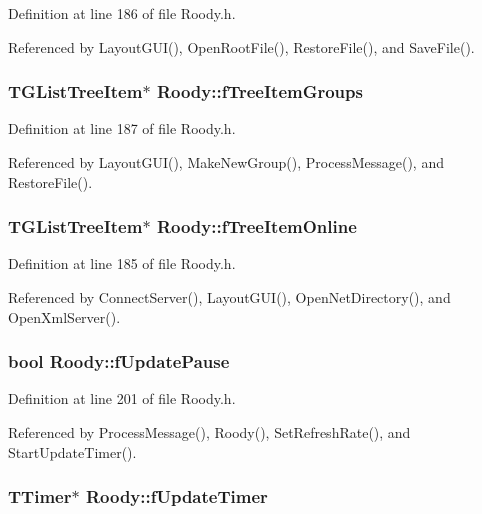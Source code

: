 Definition at line 186 of file Roody.h.

Referenced by LayoutGUI(), OpenRootFile(), RestoreFile(), and SaveFile().
\subsubsection[{fTreeItemGroups}]{\setlength{\rightskip}{0pt plus 5cm}TGListTreeItem$\ast$ {\bf Roody::fTreeItemGroups}\hspace{0.3cm}{\ttfamily  [protected]}}\label{classRoody_a992daab6fccc73ab000819a4486fe283}


Definition at line 187 of file Roody.h.

Referenced by LayoutGUI(), MakeNewGroup(), ProcessMessage(), and RestoreFile().
\subsubsection[{fTreeItemOnline}]{\setlength{\rightskip}{0pt plus 5cm}TGListTreeItem$\ast$ {\bf Roody::fTreeItemOnline}\hspace{0.3cm}{\ttfamily  [protected]}}\label{classRoody_ac608da81c5949e10666e37aea706cc5e}


Definition at line 185 of file Roody.h.

Referenced by ConnectServer(), LayoutGUI(), OpenNetDirectory(), and OpenXmlServer().
\subsubsection[{fUpdatePause}]{\setlength{\rightskip}{0pt plus 5cm}bool {\bf Roody::fUpdatePause}\hspace{0.3cm}{\ttfamily  [private]}}\label{classRoody_a96fbcb2282d22a39069dd14c326185bb}


Definition at line 201 of file Roody.h.

Referenced by ProcessMessage(), Roody(), SetRefreshRate(), and StartUpdateTimer().
\subsubsection[{fUpdateTimer}]{\setlength{\rightskip}{0pt plus 5cm}TTimer$\ast$ {\bf Roody::fUpdateTimer}\hspace{0.3cm}{\ttfamily  [private]}}\label{classRoody_acb20e66b8aab14851d46f34c10ad10bd}


